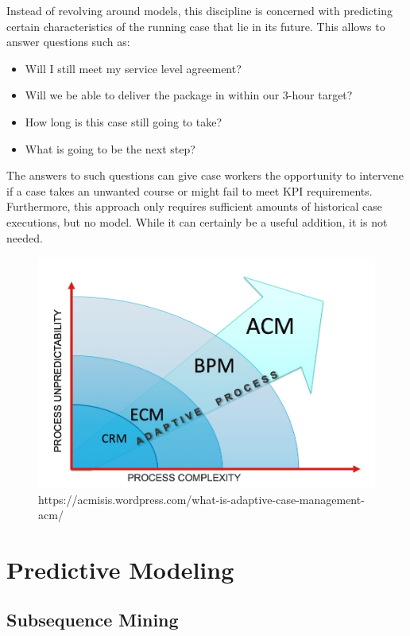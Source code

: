 Instead of revolving around models, this discipline is concerned with predicting certain characteristics of the running case that lie in its future. This allows to answer questions such as:

\begin{itemize}
    \item Will I still meet my service level agreement?
    \item Will we be able to deliver the package in within our 3-hour target?
    \item How long is this case still going to take?
    \item What is going to be the next step?
\end{itemize}

The answers to such questions can give case workers the opportunity to intervene if a case takes an unwanted course or might fail to meet KPI requirements. Furthermore, this approach only requires sufficient amounts of historical case executions, but no model. While it can certainly be a useful addition, it is not needed. 

\begin{figure}
	\centering
	\includegraphics[width=\textwidth]{gfx/acm-reasoning}
	\caption{https://acmisis.wordpress.com/what-is-adaptive-case-management-acm/}
	\label{fig:why-acm}
\end{figure}

\section{Predictive Modeling}
\subsection{Subsequence Mining}

